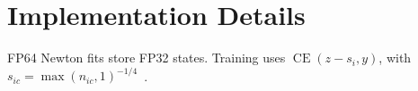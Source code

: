 \appendix
\section{Implementation Details}\label{app:complete}
\label{app:statistics}\label{app:implementation}FP64 Newton fits store FP32 states. Training uses $\operatorname{CE}(z-s_i,y)$, with $s_{ic}=\max(n_{ic},1)^{-1/\allowbreak 4}$~\cite{zhang2022fedlc}.
